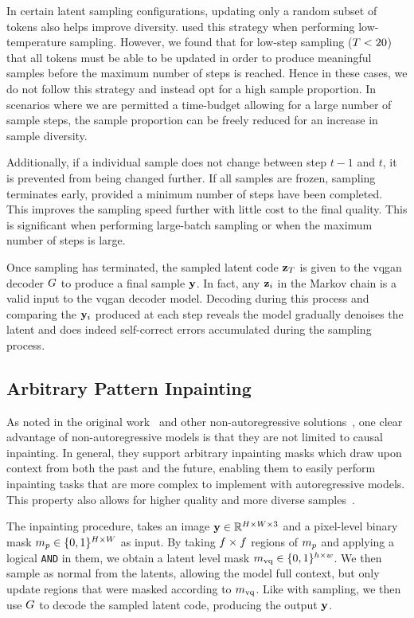 In certain latent sampling configurations, updating only a random subset of
tokens also helps improve diversity. \cite{savinov2022stepunrolled} used this
strategy when performing low-temperature sampling. However, we found that for
low-step sampling ($T<20$) that all tokens must be able to be updated
in order to produce meaningful samples before the maximum number of steps is
reached. Hence in these cases, we do not follow this strategy and instead opt
for a high sample proportion. In scenarios where we are permitted a time-budget
allowing for a large number of sample steps, the sample proportion can be freely
reduced for an increase in sample diversity.

Additionally, if a individual sample does not change between step $t-1$ and $t$,
it is prevented from being changed further. If all samples are frozen, sampling
terminates early, provided a minimum number of steps have been completed. This
improves the sampling speed further with little cost to the final quality. This
is significant when performing large-batch sampling or when the maximum number
of steps is large.

Once sampling has terminated, the sampled latent code $\mathbf{z}_T$ is given
to the \gls{vqgan} decoder $G$ to produce a final sample $\mathbf{y}$. In
fact, any $\mathbf{z}_i$ in the Markov chain is a valid input to the \gls{vqgan}
decoder model. Decoding during this process and comparing the $\mathbf{y}_i$
produced at each step reveals the model gradually denoises the latent and does
indeed self-correct errors accumulated during the sampling process.

\subsection{Arbitrary Pattern Inpainting}
\label{subsec:inpainting}

As noted in the original work~\cite{savinov2022stepunrolled} and other
non-autoregressive solutions~\cite{bondtaylor2021unleashing}, one clear
advantage of non-autoregressive models is that they are not limited to causal
inpainting. In general, they support arbitrary inpainting masks which draw upon
context from both the past and the future, enabling them to easily perform
inpainting tasks that are more complex to implement with autoregressive models.
This property also allows for higher quality and more diverse
samples~\cite{bondtaylor2021unleashing}.

The inpainting procedure, takes an image $\mathbf{y} \in \mathbb{R}^{H \times
W \times 3}$ and a pixel-level binary mask $m_p \in \{0, 1\}^{H \times
W}$ as input. By taking $f \times f$ regions of
$m_p$ and applying a logical \texttt{AND} in them, we obtain a latent
level mask $m_\textrm{vq} \in \{0,1\}^{h \times w}$. We then sample as normal from the
latents, allowing the model full context, but only update regions that were
masked according to $m_\textrm{vq}$. Like with sampling, we then use $G$
to decode the sampled latent code, producing the output $\mathbf{y}$.

